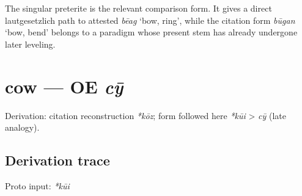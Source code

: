 \documentclass[
  british,
  a4paper,
  openany]{book}
\providecommand{\texorpdfstring}[2]{#1}
\begin{document}
The singular preterite is the relevant comparison form. It gives a
direct lautgesetzlich path to attested {\emph{bēag}} `bow, ring', while
the citation form {\emph{būgan}} `bow, bend' belongs to a paradigm whose
present stem has already undergone later leveling.

\section{\texorpdfstring{cow --- OE
\emph{cȳ}}{cow --- OE cȳ}}\label{cow-oe-cux233}


Derivation: citation reconstruction \emph{*kōz}; form followed here
\emph{*kūi} \textgreater{} \emph{cȳ} (late analogy).

\subsection{Derivation trace}\label{derivation-trace-111}

Proto input: \emph{*kūi}

\begingroup
\setlength{\fboxsep}{6pt}
\end{document}
